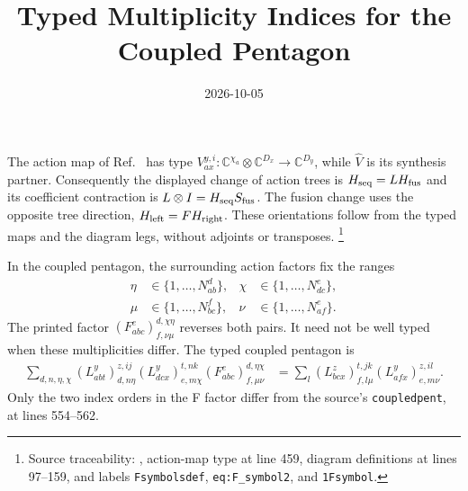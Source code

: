 \documentclass{article}
\title{Typed Multiplicity Indices for the Coupled Pentagon}
\author{}
\date{2026-10-05}
\begin{document}
\maketitle
{}

The action map of Ref.~\cite{GarreRubio2023MPOSym} has type
$V_{ax}^{y,i}:\mathbb C^{\chi_a}\otimes\mathbb C^{D_x}
    \to\mathbb C^{D_y}$, while $\widehat V$ is its synthesis partner.
Consequently the displayed change of action trees is
$H_{\rm seq}=L H_{\rm fus}$ and its coefficient contraction is
$L\otimes I=H_{\rm seq}S_{\rm fus}$. The fusion change uses the opposite
tree direction, $H_{\rm left}=F H_{\rm right}$. These orientations follow
from the typed maps and the diagram legs, without adjoints or transposes.%
\footnote{Source traceability:
    , action-map type at line 459,
    diagram definitions at lines 97--159, and labels
    \texttt{Fsymbolsdef}, \texttt{eq:F\_symbol2}, and \texttt{1Fsymbol}.}

In the coupled pentagon, the surrounding action factors fix the ranges
\begin{align}
    \eta & \in\{1,\ldots,N_{ab}^{d}\}, &
    \chi & \in\{1,\ldots,N_{dc}^{e}\},   \\
    \mu  & \in\{1,\ldots,N_{bc}^{f}\}, &
    \nu  & \in\{1,\ldots,N_{af}^{e}\}.
    \label{eq:glm_l_index_ranges}
\end{align}
The printed factor
$(F_{abc}^{e})_{f,\nu\mu}^{d,\chi\eta}$ reverses both pairs.
It need not be well typed when these multiplicities differ. The typed
coupled pentagon is
\begin{align}
    \sum_{d,n,\eta,\chi}
    (L_{abt}^{y})_{d,n\eta}^{z,ij}
    (L_{dcx}^{y})_{e,m\chi}^{t,nk}
    (F_{abc}^{e})_{f,\mu\nu}^{d,\eta\chi}
     & ={}
    \sum_l
    (L_{bcx}^{z})_{f,l\mu}^{t,jk}
    (L_{afx}^{y})_{e,m\nu}^{z,il}.
    \label{eq:glm_l_typed_pentagon}
\end{align}
Only the two index orders in the F factor differ from the source's
\texttt{coupledpent}, at lines 554--562.
\end{document}
